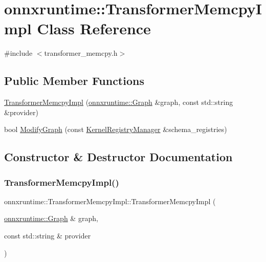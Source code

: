 \hypertarget{classonnxruntime_1_1TransformerMemcpyImpl}{}\section{onnxruntime\+:\+:Transformer\+Memcpy\+Impl Class Reference}
\label{classonnxruntime_1_1TransformerMemcpyImpl}


{\ttfamily \#include $<$transformer\+\_\+memcpy.\+h$>$}

\subsection*{Public Member Functions}
\begin{DoxyCompactItemize}
\item 
\mbox{\hyperlink{classonnxruntime_1_1TransformerMemcpyImpl_aae41c9a03dca799eb656c1246142cef9}{Transformer\+Memcpy\+Impl}} (\mbox{\hyperlink{classonnxruntime_1_1Graph}{onnxruntime\+::\+Graph}} \&graph, const std\+::string \&provider)
\item 
bool \mbox{\hyperlink{classonnxruntime_1_1TransformerMemcpyImpl_a5a3b2664aa3fad59586d08ac6bc8dd1d}{Modify\+Graph}} (const \mbox{\hyperlink{classonnxruntime_1_1KernelRegistryManager}{Kernel\+Registry\+Manager}} \&schema\+\_\+registries)
\end{DoxyCompactItemize}


\subsection{Constructor \& Destructor Documentation}
\mbox{\label{classonnxruntime_1_1TransformerMemcpyImpl_aae41c9a03dca799eb656c1246142cef9}} 
\subsubsection{\texorpdfstring{Transformer\+Memcpy\+Impl()}{TransformerMemcpyImpl()}}
{\footnotesize\ttfamily onnxruntime\+::\+Transformer\+Memcpy\+Impl\+::\+Transformer\+Memcpy\+Impl (\begin{DoxyParamCaption}\item[{\mbox{\hyperlink{classonnxruntime_1_1Graph}{onnxruntime\+::\+Graph}} \&}]{graph,  }\item[{const std\+::string \&}]{provider }\end{DoxyParamCaption})\hspace{0.3cm}{\ttfamily [inline]}}



